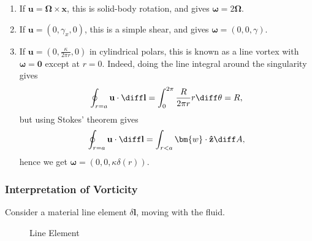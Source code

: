 \documentclass[12pt]{article}
\begin{document}
\begin{exbox}

	\begin{enumerate}
		\item If $\mathbf{u} = \bm{\Omega} \times \mathbf{x}$, this is solid-body rotation, and gives $\bm{\omega} = 2 \bm{\Omega}$.
		\item If $\mathbf{u} = (0, \gamma_x, 0)$, this is a simple shear, and gives $\bm{\omega} = (0, 0, \gamma)$.
		\item If $\mathbf{u} = (0, \frac{\kappa}{2 \pi r}, 0)$ in cylindrical polars, this is known as a line vortex with $\bm{\omega} = \mathbf{0}$ except at $r = 0$. Indeed, doing the line integral around the singularity gives
			\[
			\oint_{r = a} \mathbf{u} \cdot \diff \mathbf{l} = \int_{0}^{2 \pi} \frac{R}{2 \pi r} r \diff \theta = R
			,\]
			but using Stokes' theorem gives
			\[
			\oint_{r = a} \mathbf{u} \cdot \diff \mathbf{l} = \int_{r < a} \bm{w} \cdot \mathbf{\hat z} \diff A
			,\]
			hence we get $\bm{\omega} = (0, 0, \kappa \delta(r))$.
	\end{enumerate}

\end{exbox}

\subsubsection{Interpretation of Vorticity}
\label{subsub:interpretation_of_vorticity}

Consider a material line element $\delta \mathbf{l}$, moving with the fluid.

\begin{figure}[h]
	\centering%
	\caption{Line Element}
	\label{fig:line_element}
\end{figure}
\end{document}
